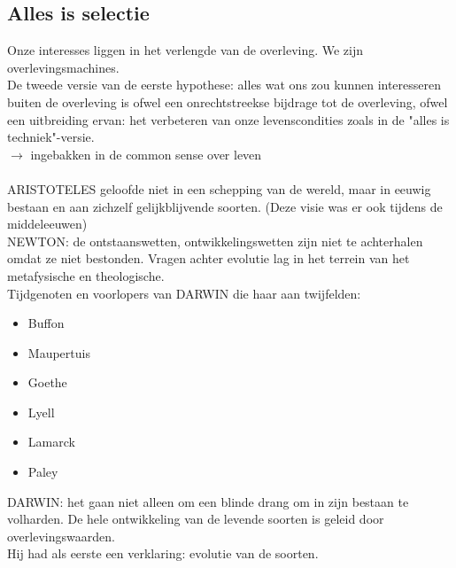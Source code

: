 \documentclass[11pt,a4paper]{article}
\begin{document}
\subsection{Alles is selectie}
Onze interesses liggen in het verlengde van de overleving. We zijn overlevingsmachines.
\\
De tweede versie van de eerste hypothese: alles wat ons zou kunnen interesseren buiten de overleving is ofwel een onrechtstreekse bijdrage tot de overleving, ofwel een uitbreiding ervan: het verbeteren van onze levenscondities zoals in de "alles is techniek"-versie.
\\
$\rightarrow$ ingebakken in de common sense over leven
\\
\\
ARISTOTELES geloofde niet in een schepping van de wereld, maar in eeuwig bestaan en aan zichzelf gelijkblijvende soorten. (Deze visie was er ook tijdens de middeleeuwen)
\\
NEWTON: de ontstaanswetten, ontwikkelingswetten zijn niet te achterhalen omdat ze niet bestonden. Vragen achter evolutie lag in het terrein van het metafysische en theologische.\\
Tijdgenoten en voorlopers van DARWIN die haar aan twijfelden:
\begin{itemize}
\item Buffon
\item Maupertuis
\item Goethe
\item Lyell
\item Lamarck
\item Paley
\end{itemize}
DARWIN: het gaan niet alleen om een blinde drang om in zijn bestaan te volharden. De hele ontwikkeling van de levende soorten is geleid door overlevingswaarden. \\Hij had als eerste een verklaring: evolutie van de soorten.
\\
\begin{center}
\end{center}
\end{document}
